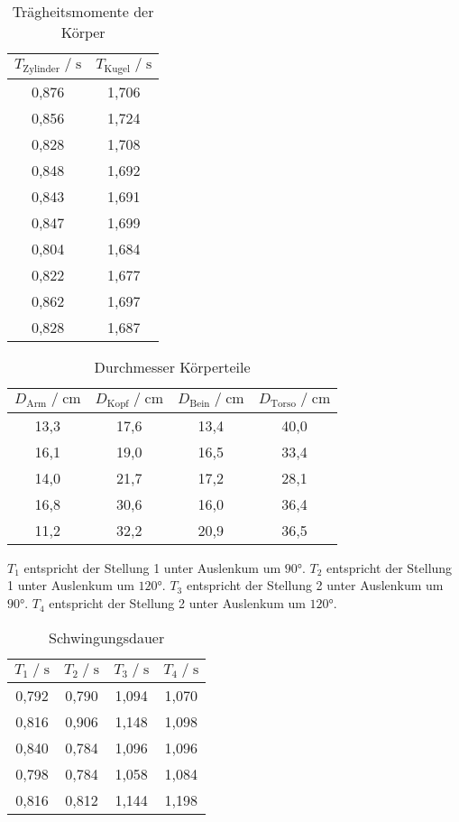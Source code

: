 \begin{table}
    \centering
     \caption{Trägheitsmomente der Körper}
     \label{tab:traegheitsmomente}
     \begin{tabular}{c c}
        \toprule
        $ T_{\text{Zylinder}} \;/\; \si{\second}$ & $ T_{\text{Kugel}} \;/\; \si{\second}$ \\
        \midrule
        0,876 & 1,706 \\
        0,856 & 1,724 \\
        0,828 & 1,708 \\
        0,848 & 1,692 \\
        0,843 & 1,691 \\
        0,847 & 1,699 \\
        0,804 & 1,684 \\
        0,822 & 1,677 \\
        0,862 & 1,697 \\
        0,828 & 1,687 \\
        \bottomrule
     \end{tabular}
 \end{table}

\begin{table}
\centering
    \caption{Durchmesser Körperteile}
    \label{tab:durchmesser}
    \begin{tabular}{c c c c}
    \toprule
    $D_\text{Arm} \;/\; \si{\centi\meter}$ & $D_\text{Kopf} \;/\; \si{\centi\meter}$ & $D_\text{Bein} \;/\; \si{\centi\meter}$ & $D_\text{Torso} \;/\; \si{\centi\meter}$ \\
    \midrule
    13,3 & 17,6 & 13,4 & 40,0 \\
    16,1 & 19,0 & 16,5 & 33,4 \\
    14,0 & 21,7 & 17,2 & 28,1 \\
    16,8 & 30,6 & 16,0 & 36,4 \\
    11,2 & 32,2 & 20,9 & 36,5 \\
    \bottomrule
    \end{tabular}
\end{table}

$T_1$ entspricht der Stellung 1 unter Auslenkum um $90°$.
$T_2$ entspricht der Stellung 1 unter Auslenkum um $120°$.
$T_3$ entspricht der Stellung 2 unter Auslenkum um $90°$.
$T_4$ entspricht der Stellung 2 unter Auslenkum um $120°$.

\begin{table}
    \centering
        \caption{Schwingungsdauer}
        \label{tab:schwingdauer}
        \begin{tabular}{c c c c}
        \toprule
        $T_1 \;/\; \si{\second}$ & $T_2 \;/\; \si{\second}$ & $T_3 \;/\; \si{\second}$ & $T_4 \;/\; \si{\second}$ \\
        \midrule
        0,792 & 0,790 & 1,094 & 1,070 \\
        0,816 & 0,906 & 1,148 & 1,098 \\
        0,840 & 0,784 & 1,096 & 1,096 \\
        0,798 & 0,784 & 1,058 & 1,084 \\
        0,816 & 0,812 & 1,144 & 1,198 \\
        \bottomrule
    \end{tabular}
\end{table}